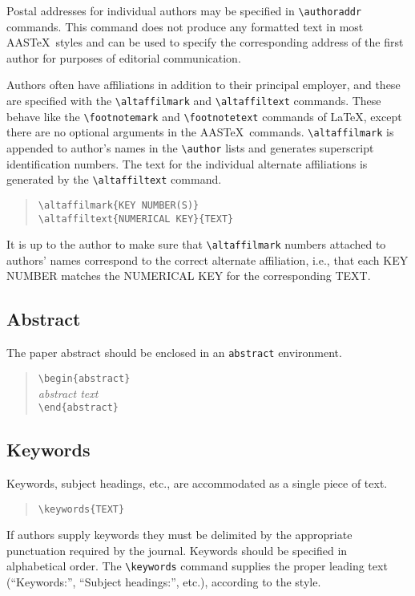 Postal addresses for individual authors may be specified in
\verb"\authoraddr" commands.  This command does not produce
any formatted text in most AAS\TeX\ styles and can be used to specify the
corresponding address of the first author for purposes of
editorial communication.

Authors often have affiliations in addition to their principal employer,
and these are specified with the \verb"\altaffilmark"
and \verb"\altaffiltext" commands.
These behave like the \verb"\footnotemark"
and \verb"\footnotetext" commands of \LaTeX, except there are no optional
arguments in the AAS\TeX\ commands.
\verb"\altaffilmark" is appended to author's names in the \verb"\author"
lists and generates superscript identification numbers.
The text for the individual alternate affiliations is generated by the
\verb"\altaffiltext" command.
\begin{quote}
\verb"\altaffilmark{KEY NUMBER(S)}"\\
\verb"\altaffiltext{NUMERICAL KEY}{TEXT}"
\end{quote}
It is up to the author to make sure that \verb"\altaffilmark" numbers
attached to authors' names correspond to the correct alternate affiliation,
i.e., that each {\small KEY NUMBER} matches the {\small NUMERICAL KEY} for
the corresponding {\small TEXT}.

\subsection{Abstract}

The paper abstract should be enclosed in an {\tt abstract} environment.
\begin{quote}
\verb"\begin{abstract}"\\
{\it abstract text\/}\\
\verb"\end{abstract}"
\end{quote}

\subsection{Keywords}

Keywords, subject headings, etc., are accommodated
as a single piece of text.
\begin{quote}
\verb"\keywords{TEXT}"
\end{quote}
If authors supply keywords they must be delimited by the appropriate punctuation
required by the journal.  Keywords should be specified in alphabetical order.
The \verb"\keywords" command
supplies the proper leading text (``Keywords:'', ``Subject headings:'',
etc.), according to the style.

